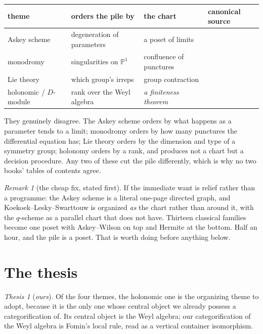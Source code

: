 \documentclass[11pt,a4paper]{article}
\theoremstyle{definition}
\theoremstyle{remark}
\newtheorem{remark}[theorem]{Remark}
\newtheorem{thesisclaim}[theorem]{Thesis}
\begin{document}
\begin{center}
\small
\renewcommand{\arraystretch}{1.3}
\begin{tabular}{@{}llll@{}}
\toprule
theme & orders the pile by & the chart & canonical source \\
\midrule
Askey scheme & degeneration of parameters & a poset of limits & \cite{KLS} \\
monodromy & singularities on $\mathbb{P}^1$ & confluence of punctures & \cite{WW} \\
Lie theory & which group's irreps & group contraction & \cite{Miller,Vilenkin} \\
holonomic / $D$-module & rank over the Weyl algebra & \emph{a finiteness theorem} & \cite{Zeil90,SST} \\
\bottomrule
\end{tabular}
\end{center}

\noindent
They genuinely disagree. The Askey scheme orders by what happens as a parameter tends
to a limit; monodromy orders by how many punctures the differential equation has;
Lie theory orders by the dimension and type of a symmetry group; holonomy orders by a
rank, and produces not a chart but a decision procedure. Any two of these cut the pile
differently, which is why no two books' tables of contents agree.

\begin{remark}[the cheap fix, stated first]\label{rem:cheap}
If the immediate want is relief rather than a programme: the Askey scheme is a
literal one-page directed graph, and Koekoek--Lesky--Swarttouw \cite{KLS} is organized
\emph{as} the chart rather than around it, with the $q$-scheme as a parallel chart
that \cite{AAR} does not have. Thirteen classical families become one poset with
Askey--Wilson on top and Hermite at the bottom. Half an hour, and the pile is a poset.
That is worth doing before anything below.
\end{remark}

\section{The thesis}

\begin{thesisclaim}[\emph{ours}]\label{thesis}
Of the four themes, the holonomic one is the organizing theme to adopt, because it is
the only one whose central object we already possess a categorification of. Its
central object is the Weyl algebra; our categorification of the Weyl algebra is
Fomin's local rule, read as a vertical container isomorphism.
\end{thesisclaim}
\end{document}
